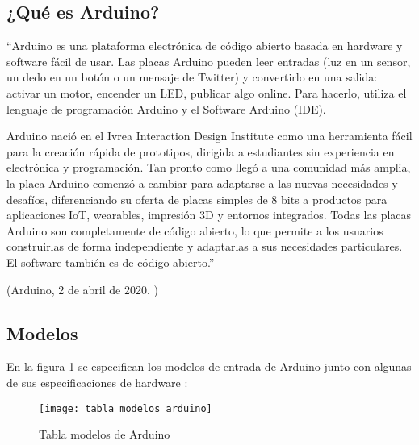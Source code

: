        \subsection{¿Qué es Arduino?} %
        \label{sub:QueEsArduino}

            ``Arduino es una plataforma electrónica de código abierto basada en hardware y software fácil de usar. Las
            placas Arduino pueden leer entradas (luz en un sensor, un dedo en un botón o un mensaje de Twitter) y
            convertirlo en una salida: activar un motor, encender un LED, publicar algo online. Para hacerlo, utiliza
            el lenguaje de programación Arduino y el Software Arduino (IDE).

            Arduino nació en el Ivrea Interaction Design Institute como una herramienta fácil para la creación rápida de
            prototipos, dirigida a estudiantes sin experiencia en electrónica y programación. Tan pronto como llegó a
            una comunidad más amplia, la placa Arduino comenzó a cambiar para adaptarse a las nuevas necesidades y
            desafíos, diferenciando su oferta de placas simples de 8 bits a productos para aplicaciones IoT, wearables,
            impresión 3D y entornos integrados. Todas las placas Arduino son completamente de código abierto, lo que
            permite a los usuarios construirlas de forma independiente y adaptarlas a sus necesidades particulares. El
            software también es de código abierto.''

            \begin{flushright}
                (Arduino, 2 de abril de 2020. \cite{arduino_introduction})
            \end{flushright}
        

        \subsection{Modelos} %
        \label{sub:ModelosArduino}

            En la figura \ref{fig:ImagenModelosArduino} se especifican los modelos de entrada de Arduino junto con algunas de sus
            especificaciones de hardware \cite{arduino_compare}:

            \begin{figure}[ht]
                \centering
                \texttt{[image: tabla\_modelos\_arduino]}
                \caption{Tabla modelos de Arduino \cite{arduino_compare}\label{fig:ImagenModelosArduino}}
            \end{figure}


